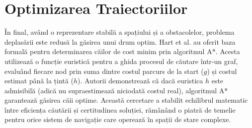 \section{Optimizarea Traiectoriilor}
\label{sec:ch2sec4}

\par În final, având o reprezentare stabilă a spațiului și a obstacolelor, problema deplasării este redusă la găsirea unui drum optim. Hart et al. \cite{4082128} au oferit baza formală pentru determinarea căilor de cost minim prin algoritmul A*. Acesta utilizează o funcție euristică pentru a ghida procesul de căutare într-un graf, evaluând fiecare nod prin suma dintre costul parcurs de la start ($g$) și costul estimat până la țintă ($h$). Autorii demonstrează că dacă euristica $h$ este admisibilă (adică nu supraestimează niciodată costul real), algoritmul A* garantează găsirea căii optime. Această cercetare a stabilit echilibrul matematic între eficiența căutării și certitudinea soluției, rămânând o piatră de temelie pentru orice sistem de navigație care operează în spații de stare complexe.
